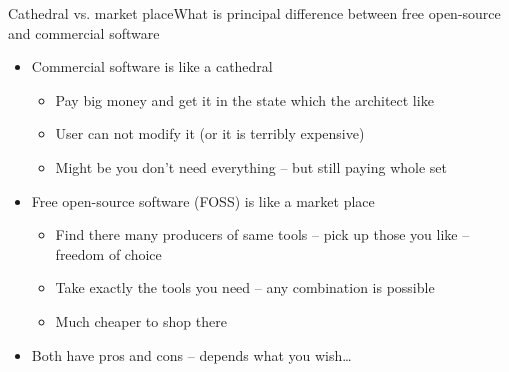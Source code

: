 \documentclass[compress, ucs, xelatex, 11pt, xcolor=svgnames,
  hyperref={
    bookmarks=true,
    unicode=true,
    colorlinks=true,
    pdftitle={Linux, command line and MetaCentrum},
    plainpages=false,
    pdfauthor={Vojtech Zeisek},
    pdfsubject={Course about use of Linux command line, writing shell scripts and using MetaCentrum of CESNET},
    pdfcreator={XeLaTeX},
    pdfkeywords={Linux, GNU, BASH, shell, command line, MetaCentrum},
    linkcolor=DarkRed,
    anchorcolor=DarkBlue,
    citecolor=Indigo,
    filecolor=NavyBlue,
    menucolor=DarkMagenta,
    urlcolor=DarkBlue,
    pdftex},
  url={hyphens, lowtilde} %
  ]{beamer}
\begin{document}
\begin{frame}{Cathedral vs. market place}{What is principal difference between free open-source and commercial software}
  \begin{itemize}
    \item Commercial software is like a cathedral
    \begin{itemize}
      \item Pay big money and get it in the state which the architect like
      \item User can not modify it (or it is terribly expensive)
      \item Might be you don't need everything -- but still paying whole set
    \end{itemize}
    \item Free open-source software (FOSS) is like a market place
    \begin{itemize}
      \item Find there many producers of same tools -- pick up those you like -- freedom of choice
      \item Take exactly the tools you need -- any combination is possible
      \item Much cheaper to shop there
    \end{itemize}
    \item Both have pros and cons -- depends what you wish\ldots
  \end{itemize}
\end{frame}
\end{document}
